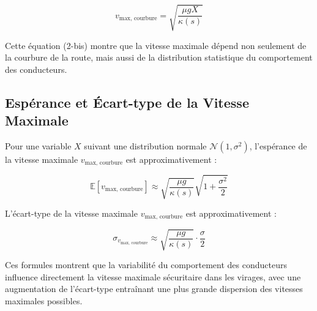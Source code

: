 \documentclass[a4paper,12pt]{article}
\begin{document}
\[
v_{\text{max, courbure}} = \sqrt{\frac{\mu g X}{\kappa(s)}} \tag{2-bis}
\]

Cette équation (2-bis) montre que la vitesse maximale dépend non seulement de la courbure de la route, mais aussi de la distribution statistique du comportement des conducteurs.

\subsection{Espérance et Écart-type de la Vitesse Maximale}

Pour une variable \( X \) suivant une distribution normale \( \mathcal{N}(1, \sigma^2) \), l'espérance de la vitesse maximale \( v_{\text{max, courbure}} \) est approximativement :

\[
\mathbb{E}[v_{\text{max, courbure}}] \approx \sqrt{\frac{\mu g}{\kappa(s)}} \sqrt{1 + \frac{\sigma^2}{2}}
\]

L'écart-type de la vitesse maximale \( v_{\text{max, courbure}} \) est approximativement :

\[
\sigma_{v_{\text{max, courbure}}} \approx \sqrt{\frac{\mu g}{\kappa(s)}} \cdot \frac{\sigma}{2}
\]

Ces formules montrent que la variabilité du comportement des conducteurs influence directement la vitesse maximale sécuritaire dans les virages, avec une augmentation de l'écart-type entraînant une plus grande dispersion des vitesses maximales possibles.
\end{document}
